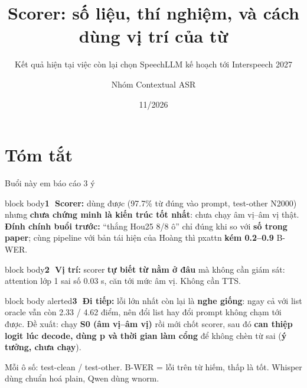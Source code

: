 \documentclass[aspectratio=169,xcolor=table]{beamer}
\title{Scorer: số liệu, thí nghiệm, và cách dùng vị trí của từ}
\subtitle{Kết quả hiện tại \ra{} việc còn lại \ra{} chọn SpeechLLM \ra{} kế hoạch tới Interspeech 2027}
\author{Nhóm Contextual ASR}
\institute{}
\date{11/2026}
\newcommand{\hi}[1]{\textcolor{Primary}{\textbf{#1}}}
\newcommand{\bad}[1]{\textcolor{RiskRed}{\textbf{#1}}}
\newcommand{\good}[1]{\textcolor{GoodGreen}{\textbf{#1}}}
\newcommand{\nbox}[2][block body]{\begin{beamercolorbox}[sep=0.45em,rounded=true]{#1}\footnotesize #2\end{beamercolorbox}}
\begin{document}
\begin{frame}[plain]\titlepage\end{frame}

\section{Tóm tắt}
\begin{frame}{Buổi này em báo cáo 3 ý}
\nbox{\textbf{\textcircled{\scriptsize 1} Scorer:} dùng được (97.7\% từ đúng vào prompt, test-other N2000) nhưng \bad{chưa chứng minh là kiến trúc tốt nhất}: chưa chạy âm vị--âm vị thật. \bad{Đính chính buổi trước:} ``thắng Hou25 8/8 ô'' chỉ đúng khi so với \textbf{số trong paper}; cùng pipeline với bản tái hiện của Hoàng thì pxattn \bad{kém 0.2--0.9} B-WER.}
\vspace{0.12cm}
\nbox{\textbf{\textcircled{\scriptsize 2} Vị trí:} scorer \good{tự biết từ nằm ở đâu} mà không cần giám sát: attention lớp 1 sai số 0.03 s, căn tới mức âm vị. Không cần TTS.}
\vspace{0.12cm}
\nbox[block body alerted]{\textbf{\textcircled{\scriptsize 3} Đi tiếp:} lỗi lớn nhất còn lại là \hi{nghe giống}: ngay cả với list oracle vẫn còn 2.33 / 4.62 điểm, nên đổi list hay đổi prompt không chạm tới được. Đề xuất: chạy \hi{S0 (âm vị--âm vị)} rồi mới chốt scorer, sau đó \hi{can thiệp logit lúc decode, dùng p và thời gian làm cổng} để không chèn từ sai (\bad{ý tưởng, chưa chạy}). }
\vspace{0.12cm}
{\footnotesize Mỗi ô số: test-clean / test-other. B-WER = lỗi trên từ hiếm, thấp là tốt. Whisper dùng chuẩn hoá plain, Qwen dùng wnorm.}
\end{frame}
\end{document}
